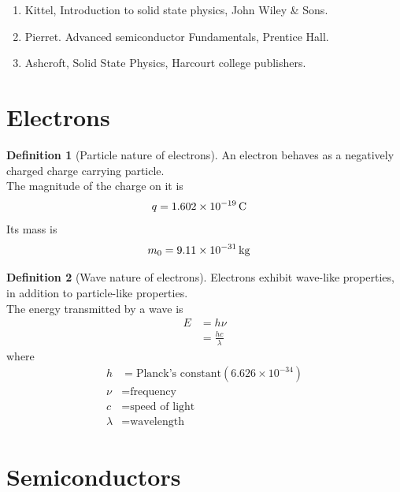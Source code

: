 \documentclass[titlepage, fleqn, a4paper, 12pt, twoside]{article}
\theoremstyle{definition}
\newtheorem{definition}{Definition}
\theoremstyle{theorem}
\begin{document}
\begin{enumerate}
	\item Kittel, Introduction to solid state physics, John Wiley \& Sons.
	\item Pierret. Advanced semiconductor Fundamentals, Prentice Hall.
	\item Ashcroft, Solid State Physics, Harcourt college publishers.
\end{enumerate}

\newpage
\section{Electrons}

\begin{definition}[Particle nature of electrons]
	An electron behaves as a negatively charged charge carrying particle.\\
	The magnitude of the charge on it is
	\begin{align*}
		q & = 1.602 \times 10^{-19} \coulomb
	\end{align*}
	Its mass is
	\begin{align*}
		m_0 & = 9.11 \times 10^{-31} \kilogram
	\end{align*}
\end{definition}

\begin{definition}[Wave nature of electrons]
	Electrons exhibit wave-like properties, in addition to particle-like properties.\\
	The energy transmitted by a wave is
	\begin{align*}
		E & = h \nu \\
                  & = \frac{h c}{\lambda}
	\end{align*}
	where
	\begin{align*}
		h       & = \text{Planck's constant} \left( 6.626 \times 10^{-34} \right) \\
		\nu     & = \text{frequency}                                              \\
		c       & = \text{speed of light}                                         \\
		\lambda & = \text{wavelength}
	\end{align*}
\end{definition}

\section{Semiconductors}
\end{document}
